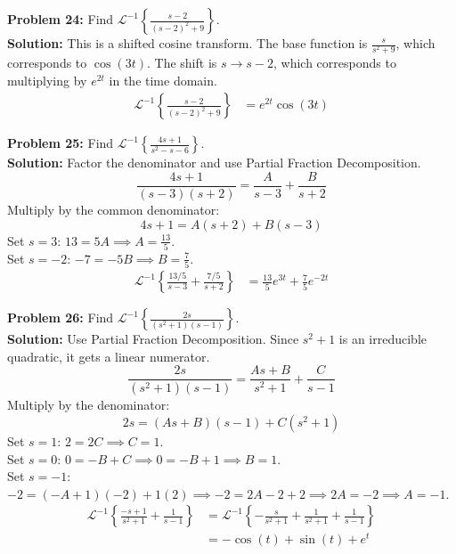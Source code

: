 \documentclass[11pt, letterpaper]{article}
\theoremstyle{definition}
\theoremstyle{remark}
\begin{document}
\vspace{1em}
\textbf{Problem 24:} Find $\mathscr{L}^{-1}\left\{\frac{s - 2}{(s-2)^2 + 9}\right\}$.
\vspace{0.5em} \\
\textbf{Solution:} This is a shifted cosine transform. The base function is $\frac{s}{s^2 + 9}$, which corresponds to $\cos(3t)$. The shift is $s \to s - 2$, which corresponds to multiplying by $e^{2t}$ in the time domain.
\begin{align*}
    \mathscr{L}^{-1}\left\{\frac{s - 2}{(s-2)^2 + 9}\right\} &= e^{2t}\cos(3t)
\end{align*}

\vspace{1em}
\textbf{Problem 25:} Find $\mathscr{L}^{-1}\left\{\frac{4s + 1}{s^2 - s - 6}\right\}$.
\vspace{0.5em} \\
\textbf{Solution:} Factor the denominator and use Partial Fraction Decomposition.
\[
\frac{4s + 1}{(s - 3)(s + 2)} = \frac{A}{s - 3} + \frac{B}{s + 2}
\]
Multiply by the common denominator:
\[
4s + 1 = A(s + 2) + B(s - 3)
\]
Set $s = 3$: $13 = 5A \implies A = \frac{13}{5}$. \\ \relax
Set $s = -2$: $-7 = -5B \implies B = \frac{7}{5}$.
\begin{align*}
    \mathscr{L}^{-1}\left\{\frac{13/5}{s - 3} + \frac{7/5}{s + 2}\right\} &= \frac{13}{5}e^{3t} + \frac{7}{5}e^{-2t}
\end{align*}

\vspace{1em}
\textbf{Problem 26:} Find $\mathscr{L}^{-1}\left\{\frac{2s}{(s^2 + 1)(s-1)}\right\}$.
\vspace{0.5em} \\
\textbf{Solution:} Use Partial Fraction Decomposition. Since $s^2 + 1$ is an irreducible quadratic, it gets a linear numerator.
\[
\frac{2s}{(s^2 + 1)(s - 1)} = \frac{As + B}{s^2 + 1} + \frac{C}{s - 1}
\]
Multiply by the denominator:
\[
2s = (As + B)(s - 1) + C(s^2 + 1)
\]
Set $s = 1$: $2 = 2C \implies C = 1$. \\ \relax
Set $s = 0$: $0 = -B + C \implies 0 = -B + 1 \implies B = 1$. \\ \relax
Set $s = -1$: $-2 = (-A + 1)(-2) + 1(2) \implies -2 = 2A - 2 + 2 \implies 2A = -2 \implies A = -1$.
\begin{align*}
    \mathscr{L}^{-1}\left\{\frac{-s + 1}{s^2 + 1} + \frac{1}{s - 1}\right\} &= \mathscr{L}^{-1}\left\{-\frac{s}{s^2 + 1} + \frac{1}{s^2 + 1} + \frac{1}{s - 1}\right\} \\[4pt]
    &= -\cos(t) + \sin(t) + e^t
\end{align*}
\end{document}
